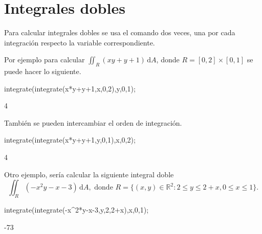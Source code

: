 
\section{Integrales dobles}
Para calcular integrales dobles se usa el comando
 dos veces, una por cada integración
respecto la variable correspondiente.

Por ejemplo para calcular
$\iint_{R} (xy+y+1)\,\mathrm{d}A$,
donde $R=[0,2]\times[0,1]$ se puede hacer lo siguiente.
\begin{maximai}
 integrate(integrate(x*y+y+1,x,0,2),y,0,1);
\end{maximai}\begin{maximao}
 4
\end{maximao}
También se pueden intercambiar el orden de integración.
\begin{maximai}
 integrate(integrate(x*y+y+1,y,0,1),x,0,2);
\end{maximai}\begin{maximao}
 4
\end{maximao}

Otro ejemplo, sería calcular la siguiente integral doble
\begin{equation*}
 \iint_{R} (-x^2y-x-3)\,\mathrm{d}A,
 \text{ donde }
 R = \{(x,y)\in\mathbb{R}^2 : 2\leq y\leq 2+x, 0\leq x\leq 1\}.
\end{equation*}
\begin{maximai}
 integrate(integrate(-x^2*y-x-3,y,2,2+x),x,0,1);
\end{maximai}\begin{maximao}
 -{{73}}
\end{maximao}
